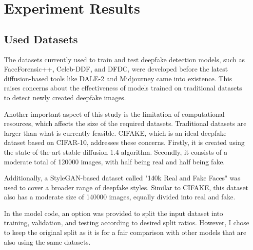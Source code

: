 \documentclass{svproc}
\begin{document}
\section{Experiment Results}
\subsection{Used Datasets}
The datasets currently used to train and test deepfake detection models,
such as FaceForensic++, Celeb-DDF, and DFDC, were developed before the latest
diffusion-based tools like DALE-2 and Midjourney came into existence. This
raises concerns about the effectiveness of models trained on traditional
datasets to detect newly created deepfake images.

Another important aspect of this study is the limitation of computational
resources, which affects the size of the required datasets. Traditional
datasets are larger than what is currently feasible. CIFAKE, which is an ideal
deepfake dataset based on CIFAR-10, addresses these concerns. Firstly, it is
created using the state-of-the-art stable-diffusion 1.4 algorithm. Secondly, it
consists of a moderate total of 120000 images, with half being real and half
being fake\cite{bird2024cifake}.

Additionally, a StyleGAN-based dataset called "140k Real and Fake Faces" was
used to cover a broader range of deepfake styles. Similar to CIFAKE, this
dataset also has a moderate size of 140000 images, equally divided into real
and fake\cite{140krvsf}.

In the model code, an option was provided to split the input dataset into
training, validation, and testing according to desired split ratios. However, I
chose to keep the original split as it is for a fair comparison with other
models that are also using the same datasets.
\end{document}
